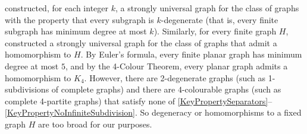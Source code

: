 \documentclass[a4paper,11pt]{article}
\theoremstyle{plain}
\theoremstyle{definition}
\renewcommand{\geq}{\geqslant}
\renewcommand{\leq}{\leqslant}
\newcommand{\GG}{\mathcal{G}}
\newcommand{\NN}{\mathbb{N}}
\begin{document}


\citet{BHM13} constructed, for each integer $k$, a strongly universal graph for the class of graphs with the property that every  subgraph is $k$-degenerate (that is, every finite subgraph has minimum degree at most $k$).  Similarly, for every finite graph $H$, \citet{MMS09} constructed a strongly universal graph for the class of graphs that admit a homomorphism to $H$.  By Euler's formula, every finite planar graph has minimum degree at most $5$, and  by the 4-Colour Theorem, every planar graph admits a homomorphism to $K_4$. However, there are 2-degenerate graphs (such as 1-subdivisions of complete graphs) and there are $4$-colourable graphs (such as complete 4-partite graphs) that satisfy none of \cref{KeyPropertySeparators}--\cref{KeyPropertyNoInfiniteSubdivision}. So degeneracy or homomorphisms to a fixed graph $H$ are too broad for our purposes.  
\end{document}
